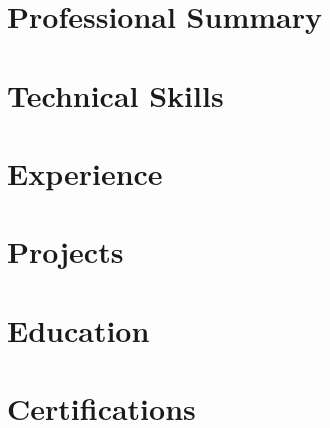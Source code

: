 \documentclass[letterpaper,11pt]{article}
\begin{document}



\section{Professional Summary}



\section{Technical Skills}



\section{Experience}



\section{Projects}



\section{Education}



\section{Certifications}


\end{document}
